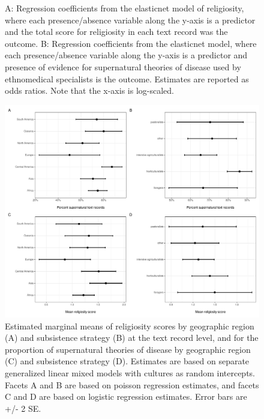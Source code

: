 \documentclass[
  11pt,
]{article}
\begin{document}
\begin{landscape}
\begin{figure}[p]
{}

\caption{A: Regression coefficients from the elasticnet model of religiosity, where each presence/absence variable along the y-axis is a predictor and the total score for religiosity in each text record was the outcome. B: Regression coefficients from the elasticnet model, where each presence/absence variable along the y-axis is a predictor and presence of evidence for supernatural theories of disease used by ethnomedical specialists is the outcome. Estimates are reported as odds ratios. Note that the x-axis is log-scaled.}\label{fig:ehrafreligionLasso}
\end{figure}




\begin{figure}[p]

{\centering \includegraphics{magic-healers-article2_files/figure-latex/ehrafRegionSub-1} 

}

\caption{Estimated marginal means of religiosity scores by geographic region (A) and subsistence strategy (B) at the text record level, and for the proportion of supernatural theories of disease by geographic region (C) and subsistence strategy (D). Estimates are based on separate generalized linear mixed models with cultures as random intercepts. Facets A and B are based on poisson regression estimates, and facets C and D are based on logistic regression estimates. Error bars are +/- 2 SE.}\label{fig:ehrafRegionSub}
\end{figure}

\end{landscape}
\end{document}
